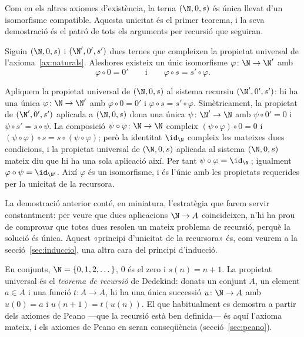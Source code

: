 Com en els altres axiomes d'existència, la terna \((\N,0,s)\) és única
llevat d'un isomorfisme compatible. Aquesta unicitat és el primer teorema,
i la seva demostració és el patró de tots els arguments per recursió que
seguiran.

\begin{teorema}\label{teo:nno-unicitat}
Siguin \((\N,0,s)\) i \((\N',0',s')\) dues ternes que compleixen la
propietat universal de l'axioma~\ref{ax:naturals}. Aleshores existeix un
únic isomorfisme \(\varphi\colon\N\to\N'\) amb
\[
\varphi\circ 0=0'
\qquad\text{i}\qquad
\varphi\circ s=s'\circ\varphi .
\]
\end{teorema}

\begin{prova}
Apliquem la propietat universal de \((\N,0,s)\) al sistema recursiu
\((\N',0',s')\): hi ha una única \(\varphi\colon\N\to\N'\) amb
\(\varphi\circ 0=0'\) i \(\varphi\circ s=s'\circ\varphi\). Simètricament,
la propietat de \((\N',0',s')\) aplicada a \((\N,0,s)\) dona una única
\(\psi\colon\N'\to\N\) amb \(\psi\circ 0'=0\) i
\(\psi\circ s'=s\circ\psi\). La composició \(\psi\circ\varphi\colon\N\to\N\)
compleix \((\psi\circ\varphi)\circ 0=0\) i
\((\psi\circ\varphi)\circ s=s\circ(\psi\circ\varphi)\); però la identitat
\(\id_\N\) compleix les mateixes dues condicions, i la propietat universal
de \((\N,0,s)\) aplicada al sistema \((\N,0,s)\) mateix diu que hi ha una
sola aplicació així. Per tant \(\psi\circ\varphi=\id_\N\, \); igualment
\(\varphi\circ\psi=\id_{\N'}\). Així \(\varphi\) és un isomorfisme, i és
l'únic amb les propietats requerides per la unicitat de la recursora.
\end{prova}

\begin{observacio}\label{obs:unicitat-recursio}
La demostració anterior conté, en miniatura, l'estratègia que farem servir
constantment: per veure que dues aplicacions \(\N\to A\) coincideixen,
n'hi ha prou de comprovar que totes dues resolen un mateix problema de
recursió, perquè la solució és única. Aquest «principi d'unicitat de la
recursora» és, com veurem a la secció~\ref{sec:induccio}, una altra cara
del principi d'inducció.
\end{observacio}

\begin{observacio}\label{obs:nno-classica}
En conjunts, \(\N=\{0,1,2,\dots\}\), \(0\) és el zero i \(s(n)=n+1\). La
propietat universal és el \emph{teorema de recursió} de Dedekind: donats
un conjunt \(A\), un element \(a\in A\) i una funció \(t\colon A\to A\),
hi ha una única successió \(u\colon\N\to A\) amb \(u(0)=a\) i
\(u(n+1)=t(u(n))\). El que habitualment es demostra a partir dels axiomes
de Peano ---que la recursió està ben definida--- és aquí l'axioma mateix,
i els axiomes de Peano en seran conseqüència
(secció~\ref{sec:peano}).
\end{observacio}


